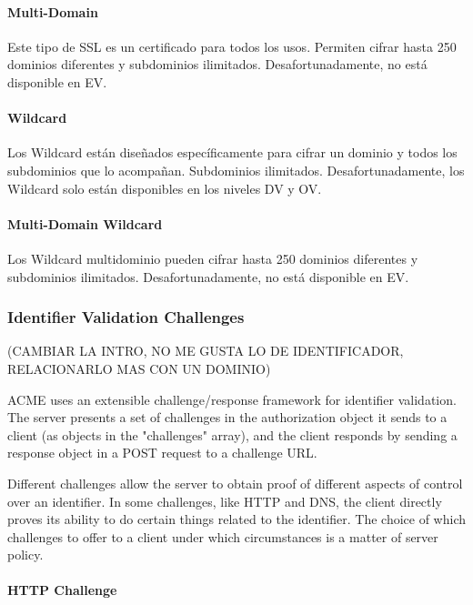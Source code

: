   \paragraph*{Multi-Domain}
  Este tipo de SSL es un certificado para todos los usos. Permiten cifrar 
  hasta 250 dominios diferentes y subdominios 
  ilimitados. Desafortunadamente, no está disponible en EV.
  
  \paragraph*{Wildcard}
  
  Los Wildcard están diseñados específicamente para cifrar un dominio y 
  todos los subdominios que lo acompañan. Subdominios ilimitados. 
  Desafortunadamente, los Wildcard solo están disponibles en los 
  niveles DV y OV.
  
  \paragraph*{Multi-Domain Wildcard}
  Los Wildcard multidominio pueden cifrar hasta 250 dominios diferentes 
  y subdominios ilimitados. Desafortunadamente, no está disponible en EV.

  
\subsubsection*{Identifier Validation Challenges}

(CAMBIAR LA INTRO, NO ME GUSTA LO DE IDENTIFICADOR, RELACIONARLO MAS CON UN DOMINIO)

ACME uses an extensible challenge/response framework for identifier
validation.  The server presents a set of challenges in the
authorization object it sends to a client (as objects in the
"challenges" array), and the client responds by sending a response
object in a POST request to a challenge URL.

   Different challenges allow the server to obtain proof of different
   aspects of control over an identifier.  In some challenges, like HTTP
   and DNS, the client directly proves its ability to do certain things
   related to the identifier.  The choice of which challenges to offer
   to a client under which circumstances is a matter of server policy.


   

\paragraph*{HTTP Challenge}

